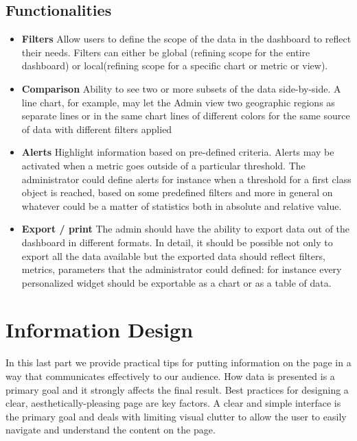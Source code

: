 \documentclass[a4paper,13pt]{report}
\begin{document}
\subsection{Functionalities}
\begin{itemize}
\item \textbf{Filters}\newline
Allow users to define the scope of the data in the dashboard to reflect their needs. Filters can either be global (refining scope for the entire dashboard) or local(refining scope for a specific chart or metric or view).

\item \textbf{Comparison}\newline
Ability to see two or more subsets of the data side-by-side. A line chart, for example, may let the  Admin view two geographic regions as separate lines or in the same chart lines of different colors for the same source of data with different filters applied

\item \textbf{Alerts}\newline
Highlight information based on pre-defined criteria. Alerts may be activated when a metric goes outside of a particular threshold.  The administrator could define alerts for instance when a threshold for a first class object is reached, based on some predefined filters and more in general on whatever could be a matter of statistics both in absolute and relative value.

\item \textbf{Export / print}\newline
The  admin should have the ability to export data out of the dashboard in different formats. In detail, it should be possible  not only to export all the data available but the exported data should reflect filters, metrics, parameters that the administrator could defined: for instance every personalized widget should be exportable as a chart or as a table of data.
\end{itemize}

\section{Information Design}
In this last part we provide practical tips for putting information on the page in a way that communicates effectively to our audience. How data is presented is a primary goal and it strongly affects the final result. Best practices for designing a clear, aesthetically-pleasing page are key factors.\newline
A clear and simple interface is the primary goal and deals with limiting visual clutter to allow the user to easily navigate and understand the content on the page.
\end{document}
